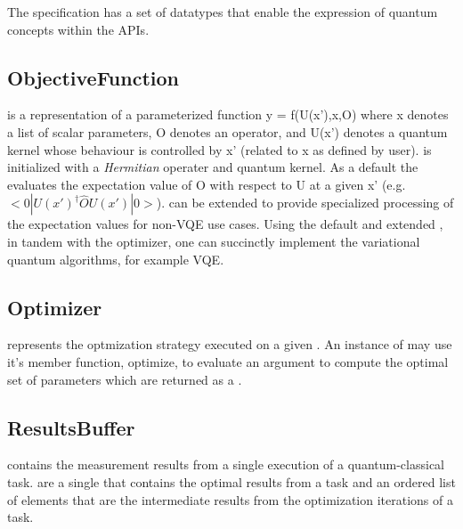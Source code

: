 The \qcor specification has a set of datatypes that enable the expression of quantum concepts within the \qcor \ac{API}s.\\

\subsection{\textbf{ObjectiveFunction}}\label{subsec:ObjectiveFunction}
 is a representation of a parameterized function y = f(U(x'),x,O)
where x denotes a list of scalar parameters, O denotes an operator, and U(x') denotes a quantum kernel whose behaviour is controlled by x' (related to x as defined by user).  is initialized with a {\em Hermitian} operater and quantum kernel. As a default the  evaluates the expectation value of O with respect to U at a given x' (e.g. $<0|U(x')^\dagger \hat{O} U(x')|0>$).  can be extended to provide specialized processing of the expectation values for non-VQE use cases. Using the default and extended , in tandem with the optimizer, one can succinctly implement the variational quantum algorithms, for example VQE.  

\subsection{\textbf{Optimizer}}\label{subsec:Optimizer}
 represents the optmization strategy executed on a given . An instance of  may use it's member function, optimize, to evaluate an  argument to compute the optimal set of parameters which are returned as a .\\


\subsection{\textbf{ResultsBuffer}}\label{subsec:ResultsBuffer}
 contains the measurement results from a single execution of a quantum-classical task.  are a single  that contains the optimal results from a task and an ordered list of  elements that are the intermediate results from the optimization iterations of a task.\\

